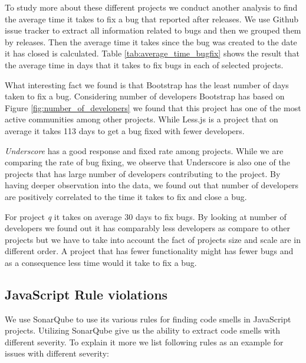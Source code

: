 To study more about these different projects we conduct another analysis to find the average time it takes to fix a bug that reported after releases. We use Github issue tracker to extract all information related to bugs and then we grouped them by releases. Then the average time it takes since the bug was created to the date it has closed is calculated. Table \ref{tab:average_time_bugfix} shows the result that the average time in days that it takes to fix bugs in each of selected projects.  
\par 
What interesting fact we found is that Bootstrap has the least number of days taken to fix a bug. Considering number of developers Bootstrap has based on Figure \ref{fig:number_of_developers} we found that this project has one of the most active communities among other projects. While Less.js is a project that on average it takes 113 days to get a bug fixed with fewer developers. 
\par
\textit{Underscore} has a good response and fixed rate among projects. While we are comparing the rate of bug fixing, we observe that Underscore is also one of the projects that has large number of developers contributing to the project. By having deeper observation into the data, we found out that number of developers are positively correlated to the time it takes to fix and close a bug.

\par For project \textit{q} it takes on average 30 days to fix bugs. By looking at number of developers we found out it has comparably less developers as compare to other projects but we have to take into account the fact of projects size and scale are in different order. A project that has fewer functionality might has fewer bugs and as a consequence less time would it take to fix a bug.

\subsection{JavaScript Rule violations}
We use SonarQube to use its various rules for finding code smells in JavaScript projects. Utilizing SonarQube give us the ability to extract code smells with different severity. To explain it more we list following rules as an example for issues with different severity:

